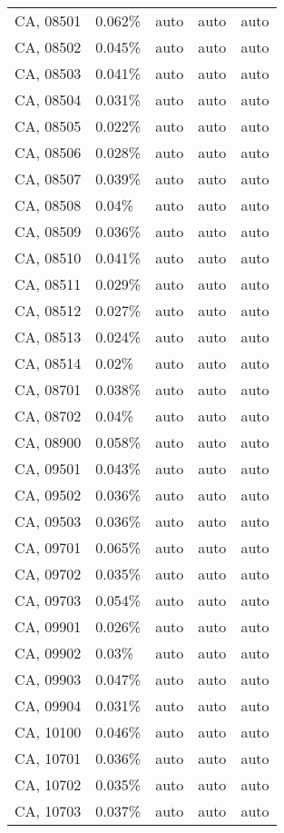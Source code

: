 \begin{longtable}[]{@{}lllll@{}}
CA, 08501 & 0.062\% & auto & auto & auto \\
CA, 08502 & 0.045\% & auto & auto & auto \\
CA, 08503 & 0.041\% & auto & auto & auto \\
CA, 08504 & 0.031\% & auto & auto & auto \\
CA, 08505 & 0.022\% & auto & auto & auto \\
CA, 08506 & 0.028\% & auto & auto & auto \\
CA, 08507 & 0.039\% & auto & auto & auto \\
CA, 08508 & 0.04\% & auto & auto & auto \\
CA, 08509 & 0.036\% & auto & auto & auto \\
CA, 08510 & 0.041\% & auto & auto & auto \\
CA, 08511 & 0.029\% & auto & auto & auto \\
CA, 08512 & 0.027\% & auto & auto & auto \\
CA, 08513 & 0.024\% & auto & auto & auto \\
CA, 08514 & 0.02\% & auto & auto & auto \\
CA, 08701 & 0.038\% & auto & auto & auto \\
CA, 08702 & 0.04\% & auto & auto & auto \\
CA, 08900 & 0.058\% & auto & auto & auto \\
CA, 09501 & 0.043\% & auto & auto & auto \\
CA, 09502 & 0.036\% & auto & auto & auto \\
CA, 09503 & 0.036\% & auto & auto & auto \\
CA, 09701 & 0.065\% & auto & auto & auto \\
CA, 09702 & 0.035\% & auto & auto & auto \\
CA, 09703 & 0.054\% & auto & auto & auto \\
CA, 09901 & 0.026\% & auto & auto & auto \\
CA, 09902 & 0.03\% & auto & auto & auto \\
CA, 09903 & 0.047\% & auto & auto & auto \\
CA, 09904 & 0.031\% & auto & auto & auto \\
CA, 10100 & 0.046\% & auto & auto & auto \\
CA, 10701 & 0.036\% & auto & auto & auto \\
CA, 10702 & 0.035\% & auto & auto & auto \\
CA, 10703 & 0.037\% & auto & auto & auto \\

\end{longtable}
